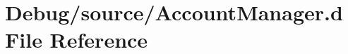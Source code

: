 \hypertarget{_account_manager_8d}{}\section{Debug/source/\+Account\+Manager.d File Reference}
\label{_account_manager_8d}
